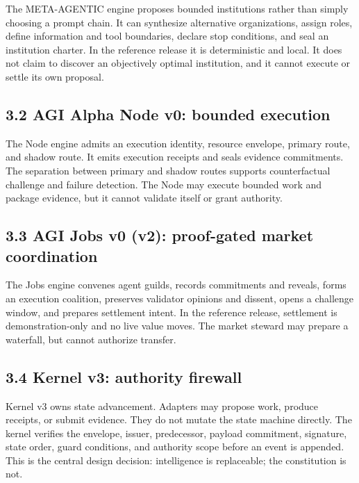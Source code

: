 The META-AGENTIC engine proposes bounded institutions rather than simply
choosing a prompt chain. It can synthesize alternative organizations,
assign roles, define information and tool boundaries, declare stop
conditions, and seal an institution charter. In the reference release it
is deterministic and local. It does not claim to discover an objectively
optimal institution, and it cannot execute or settle its own proposal.

\subsection{3.2 AGI Alpha Node v0: bounded
execution}\label{agi-alpha-node-v0-bounded-execution}

The Node engine admits an execution identity, resource envelope, primary
route, and shadow route. It emits execution receipts and seals evidence
commitments. The separation between primary and shadow routes supports
counterfactual challenge and failure detection. The Node may execute
bounded work and package evidence, but it cannot validate itself or
grant authority.

\subsection{3.3 AGI Jobs v0 (v2): proof-gated market
coordination}\label{agi-jobs-v0-v2-proof-gated-market-coordination}

The Jobs engine convenes agent guilds, records commitments and reveals,
forms an execution coalition, preserves validator opinions and dissent,
opens a challenge window, and prepares settlement intent. In the
reference release, settlement is demonstration-only and no live value
moves. The market steward may prepare a waterfall, but cannot authorize
transfer.

\subsection{3.4 Kernel v3: authority
firewall}\label{kernel-v3-authority-firewall}

Kernel v3 owns state advancement. Adapters may propose work, produce
receipts, or submit evidence. They do not mutate the state machine
directly. The kernel verifies the envelope, issuer, predecessor, payload
commitment, signature, state order, guard conditions, and authority
scope before an event is appended. This is the central design decision:
intelligence is replaceable; the constitution is not.

